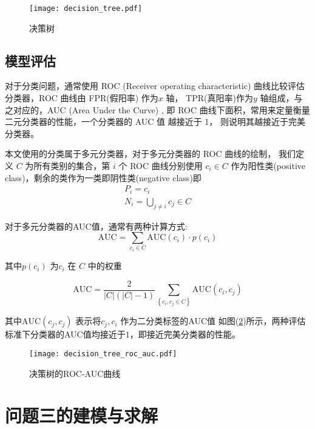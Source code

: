 \documentclass[withoutpreface,bwprint]{cumcmthesis} %
\begin{document}
\begin{figure}[!h]
	\centering
	\texttt{[image: decision\_tree.pdf]}
	\caption{决策树}
	\label{fig:decision_tree}
\end{figure}





\subsection{模型评估}
对于分类问题，通常使用 ROC (Receiver operating characteristic) \cite{fawcett2006introduction}
曲线比较评估分类器，ROC 曲线由 FPR(假阳率) 作为$x$ 轴，
TPR(真阳率)作为$y$ 轴组成，与之对应的，AUC (Area Under the Curve) \cite{fawcett2006introduction},
即 ROC 曲线下面积，常用来定量衡量二元分类器的性能，一个分类器的 AUC 值
越接近于 1， 则说明其越接近于完美分类器。

本文使用的分类属于多元分类器，对于多元分类器的 ROC 曲线的绘制，
我们定义 $C$ 为所有类别的集合，第 $i$ 个 ROC 曲线分别使用 $c_i \in C$
作为阳性类(positive class)，剩余的类作为一类即阴性类(negative class)即
\begin{gather}
	P_i = c_i  \\
	N_i = \bigcup_{j \neq i} c_j \in C
\end{gather}

对于多元分类器的AUC值，通常有两种计算方式:
\begin{equation}
	\text{AUC} = \sum_{c_i \in C} \text{AUC}(c_i) \cdot p(c_i)
\end{equation}

其中$p(c_i)$ 为$c_i$ 在 $C$ 中的权重

\begin{equation}
	\text{AUC} = \dfrac{2}{\left | C \right |\left ( \left | C \right |-1  \right )}\sum_{\left \{ c_{i},c_{j}\in C \right \} }\text{AUC}\left ( c_{i},c_{j} \right )
\end{equation}

其中$\text{AUC}(c_j, c_j)$ 表示将$c_j, c_i$ 作为二分类标签的AUC值
如图(\ref{fig:decision_tree_roc_auc})所示，两种评估标准下分类器的AUC值均接近于$1$，即接近完美分类器的性能。

\begin{figure}[!h]
	\centering
	\texttt{[image: decision\_tree\_roc\_auc.pdf]}
	\caption{决策树的ROC-AUC曲线}
	\label{fig:decision_tree_roc_auc}
\end{figure}




\section{问题三的建模与求解}
\end{document}
